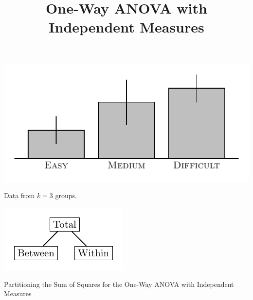 \documentclass{tufte-handout}
\title{One-Way ANOVA with Independent Measures}
\date{} %
\begin{document}
\maketitle%




\begin{marginfigure}[20pt]
  \includegraphics[width=\linewidth]{anova_data_one-way}%
  \label{fig:fullfig}%
  \caption{Data from $k=3$ groups.}
\end{marginfigure}

\begin{marginfigure}[10pt]
  \includegraphics[width=\linewidth]{anova_partition_one_way_indep}%
  \label{fig:fullfig}%
  \caption{Partitioning the Sum of Squares for the One-Way ANOVA with Independent Measures}
\end{marginfigure}
\end{document}
